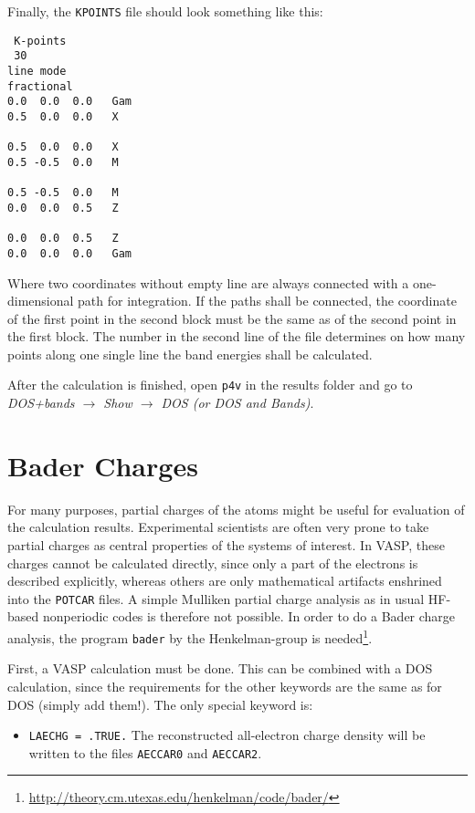 \documentclass[a4paper,11pt]{article}
\begin{document}
Finally, the \texttt{KPOINTS} file should look something like this:

\begin{verbatim}
 K-points
 30
line mode
fractional
0.0  0.0  0.0   Gam
0.5  0.0  0.0   X

0.5  0.0  0.0   X
0.5 -0.5  0.0   M

0.5 -0.5  0.0   M
0.0  0.0  0.5   Z

0.0  0.0  0.5   Z
0.0  0.0  0.0   Gam
\end{verbatim}

Where two coordinates without empty line are always connected with a one-dimensional path 
for integration. If the paths shall be connected, the coordinate of the first point in the 
second block must be the same as of the second point in the first block.
The number in the second line of the file determines on how many points along one single line the
band energies shall be calculated.

After the calculation is finished, open \texttt{p4v} in the results folder and go to \textit{DOS+bands $\rightarrow$ Show $\rightarrow$ DOS (or DOS and Bands)}.

\section{Bader Charges}

For many purposes, partial charges of the atoms might be useful for evaluation of the 
calculation results. Experimental scientists are often very prone to take partial
charges as central properties of the systems of interest.
In VASP, these charges cannot be calculated directly, since only a part of the electrons 
is described explicitly, whereas others are only mathematical artifacts enshrined into 
the \texttt{POTCAR} files. A simple Mulliken partial charge analysis as in usual HF-based
nonperiodic codes is therefore not possible.
In order to do a Bader charge analysis, the program \texttt{bader} by the Henkelman-group is
needed\footnote{\url{http://theory.cm.utexas.edu/henkelman/code/bader/}}.

First, a VASP calculation must be done. This can be combined with a DOS calculation,
since the requirements for the other keywords are the same as for DOS (simply add them!).
The only special keyword is:

\begin{itemize}
 \item \texttt{LAECHG = .TRUE.} The reconstructed all-electron charge density will be written 
 to the files \texttt{AECCAR0} and \texttt{AECCAR2}.
\end{itemize}
\end{document}
